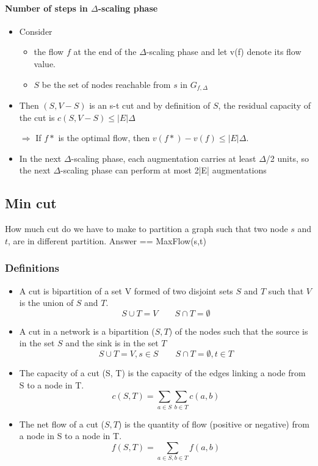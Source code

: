 \paragraph{Number of steps in $\Delta$-scaling phase}
\begin{itemize}
    \item Consider \begin{itemize}
                \item the flow $f$ at the end of the $\Delta$-scaling phase
and let v(f) denote its flow value.
                \item $S$ be the set of nodes reachable from $s$ in
                    $G_{f,\Delta}$
                    \end{itemize}
    \item Then $(S,V-S)$ is an s-t cut and by definition of $S$, the residual
capacity of the cut is $c(S,V-S) ≤ |E|\Delta$

    \item[$\Rightarrow$] If $f*$ is the optimal flow, then $v(f*)-v(f)
        \leq |E|\Delta$.

        \item In the next $\Delta$-scaling phase, each augmentation carries
at least $\Delta$/2 units, so the next $\Delta$-scaling phase can perform at most 2|E|
augmentations
\end{itemize}

\subsection{Min cut}

How much cut do we have to make to partition a graph such that two node
$s$ and $t$, are in different partition. Answer == MaxFlow(s,t)

\subsubsection{Definitions}

\begin{itemize}
    \item A cut is bipartition of a set V formed of two disjoint sets
        $S$ and $T$ such that $V$ is the union of $S$ and $T$.
        $$S \cup T = V \quad \quad S \cap T = \emptyset $$

    \item A cut in a network is a bipartition ($S, T$) of the nodes such
        that the source is in the set $S$ and the sink is in the set $T$
        $$S \cup T = V , s\in S\quad \quad S \cap T = \emptyset, t \in
        T$$

    \item The capacity of a cut (S, T) is the capacity of the edges
        linking
        a node from S to a node in T.
        $$c(S, T) = \sum_{a\in S} \sum_{b \in T} c(a, b)$$

    \item The net flow of a cut ($S, T$) is the quantity of flow
        (positive or
        negative) from a node in S to a node in T.
        $$f(S, T) = \sum_{a\in S, b\in T} f(a, b)$$

\end{itemize}

